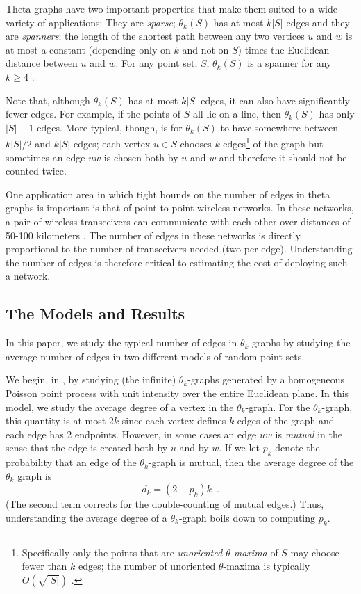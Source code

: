 \documentclass{patmorin}
\begin{document}
Theta graphs have two important properties that make them suited to a
wide variety of applications:  They are \emph{sparse}; $\theta_k(S)$
has at most $k|S|$ edges and they are \emph{spanners}; the length
of the shortest path between any two vertices $u$ and $w$ is at most
a constant (depending only on $k$ and not on $S$) times the Euclidean
distance between $u$ and $w$.  For any point set, $S$, $\theta_k(S)$ is
a spanner for any $k\ge 4$
\cite{barba.bose.ea:on,bonichon.gavoille.ea:connections,%
bose.morin.ea:theta-5,keil:approximating,ruppert.seidel:approximating}.

Note that, although $\theta_k(S)$ has at most $k|S|$ edges, it can also
have significantly fewer edges.  For example, if the points of $S$ all
lie on a line, then $\theta_k(S)$ has only $|S|-1$ edges.  More typical,
though, is for $\theta_k(S)$ to have somewhere between $k|S|/2$ and $k|S|$
edges;  each vertex $u\in S$ chooses $k$ edges\footnote{Specifically only
the points that are \emph{unoriented $\theta$-maxima} of $S$ may choose
fewer than $k$ edges; the number of unoriented $\theta$-maxima is typically
$O(\sqrt{|S|})$ \cite[Theorem~4]{avis.beresford-smith.ea:unoriented}.}
of the graph but sometimes an edge $uw$ is chosen both by $u$ and $w$
and therefore it should not be counted twice.

One application area in which tight bounds on the number of edges in
theta graphs is important is that of point-to-point wireless networks.
In these networks, a pair of wireless transceivers can communicate with
each other over distances of 50-100 kilometers \cite{rysavy:wireless}.
The number of edges in these networks is directly proportional to the
number of transceivers needed (two per edge).  Understanding the
number of edges is therefore critical to estimating the cost of deploying
such a network.

\subsection{The Models and Results}

In this paper, we study the typical number of edges in $\theta_k$-graphs
by studying the average number of edges in two different models of random
point sets.

We begin, in , by studying (the infinite)
$\theta_k$-graphs generated by a homogeneous Poisson point process
with unit intensity over the entire Euclidean plane.  In this model,
we study the average degree of a vertex in the $\theta_k$-graph.
For the $\theta_k$-graph, this quantity is at most $2k$ since each
vertex defines $k$ edges of the graph and each edge has 2 endpoints.
However, in some cases an edge $uw$ is \emph{mutual} in the sense that
the edge is created both by $u$ and by $w$.  If we let $p_k$ denote the
probability that an edge of the $\theta_k$-graph is mutual, then the
average degree of the $\theta_k$ graph is
\[
    d_k = (2-p_k)k \enspace .
\]
(The second term corrects for the double-counting of mutual edges.)  Thus,
understanding the average degree of a $\theta_k$-graph boils down to
computing $p_k$.
\end{document}
